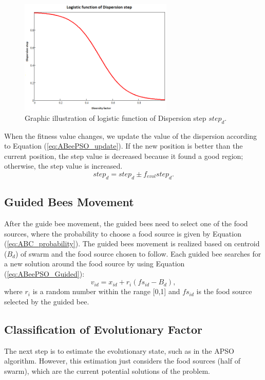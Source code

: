\begin{figure}[!h]
\centering
 \includegraphics[width=0.65\textwidth]{image/Logistic.png}
 \caption{\small{Graphic illustration of logistic function of Dispersion step $step_d$.}}
 \label{fig:ABeePSO_logistic}
\end{figure}


When the fitness value changes, we update the value of the dispersion according to Equation (\ref{eq:ABeePSO_update}). If the new position is better than the current position, the step value is decreased because it found a good region; otherwise, the step value is increased.
\begin{equation} \label{eq:ABeePSO_update}
step_d = step_d \pm f_{evol}step_d.
\end{equation}

\subsection{Guided Bees Movement}
After the guide bee movement, the guided bees need to select one of the food sources, where the probability to choose a food source is given by Equation (\ref{eq:ABC_probability}). The guided bees movement is realized based on centroid ($B_d$) of swarm and the food source chosen to follow. Each guided bee searches for a new solution around the food source by using Equation (\ref{eq:ABeePSO_Guided}):
\begin{equation}\label{eq:ABeePSO_Guided}
v_{id} = x_{id} + r_{i}(fs_{id} - B_d),
\end{equation}
where $r_{i}$ is a random number within the range [0,1] and $fs_{id}$ is the food source selected by the guided bee.

\subsection{Classification of Evolutionary Factor}
The next step is to estimate the evolutionary state, such as in the APSO algorithm. However, this estimation just considers the food sources (half of swarm), which are the current potential solutions of the problem.

